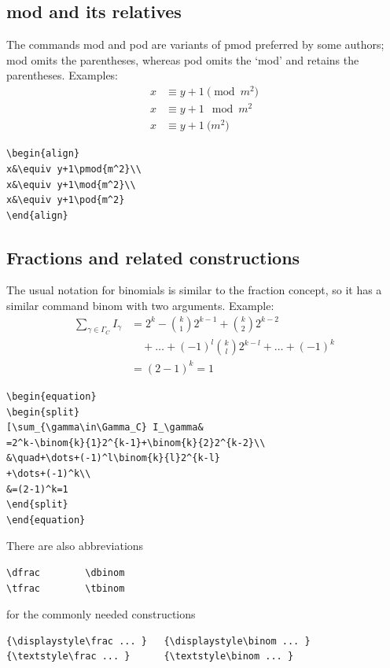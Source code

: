 \documentclass{article}
\newcommand{\ntt}{\normalfont\ttfamily}
\newcommand{\cn}[1]{{\protect\ntt\bslash#1}}
\theoremstyle{definition}
\theoremstyle{remark}
\begin{document}
\subsection{\cn{mod} and its relatives}
The commands \cn{mod} and \cn{pod} are variants of
\cn{pmod} preferred by some authors; \cn{mod} omits the parentheses,
whereas \cn{pod} omits the `mod' and retains the parentheses.
Examples:
\begin{align}
x&\equiv y+1\pmod{m^2}\\
x&\equiv y+1\mod{m^2}\\
x&\equiv y+1\pod{m^2}
\end{align}
\begin{verbatim}
\begin{align}
x&\equiv y+1\pmod{m^2}\\
x&\equiv y+1\mod{m^2}\\
x&\equiv y+1\pod{m^2}
\end{align}
\end{verbatim}

\subsection{Fractions and related constructions}
\label{fracs}

The usual notation for binomials is similar to the fraction concept,
so it has a similar command \cn{binom} with two arguments. Example:
\begin{equation}
\begin{split}
\sum_{\gamma\in\Gamma_C} I_\gamma&
=2^k-\binom{k}{1}2^{k-1}+\binom{k}{2}2^{k-2}\\
&\quad+\dots+(-1)^l\binom{k}{l}2^{k-l}
+\dots+(-1)^k\\
&=(2-1)^k=1
\end{split}
\end{equation}
\begin{verbatim}
\begin{equation}
\begin{split}
[\sum_{\gamma\in\Gamma_C} I_\gamma&
=2^k-\binom{k}{1}2^{k-1}+\binom{k}{2}2^{k-2}\\
&\quad+\dots+(-1)^l\binom{k}{l}2^{k-l}
+\dots+(-1)^k\\
&=(2-1)^k=1
\end{split}
\end{equation}
\end{verbatim}
There are also abbreviations
\begin{verbatim}
\dfrac        \dbinom
\tfrac        \tbinom
\end{verbatim}
for the commonly needed constructions
\begin{verbatim}
{\displaystyle\frac ... }   {\displaystyle\binom ... }
{\textstyle\frac ... }      {\textstyle\binom ... }
\end{verbatim}
\end{document}
